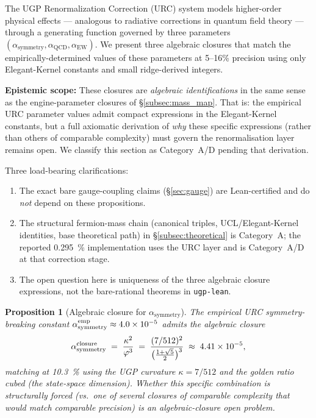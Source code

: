 \documentclass[11pt]{article}
\newtheorem{proposition}[theorem]{Proposition}
\theoremstyle{remark}
\begin{document}
The UGP Renormalization Correction (URC) system models higher-order physical effects --- analogous to radiative corrections in quantum field theory --- through a generating function governed by three parameters $(\alpha_{\mathrm{symmetry}}, \alpha_{\mathrm{QCD}}, \alpha_{\mathrm{EW}})$.
We present three algebraic closures that match the empirically-determined values of these parameters at 5--16\% precision using only Elegant-Kernel constants and small ridge-derived integers.

\noindent\textbf{Epistemic scope:}  These closures are \emph{algebraic identifications} in the same sense as the engine-parameter closures of \S\ref{subsec:mass_map}.
That is: the empirical URC parameter values admit compact expressions in the Elegant-Kernel constants, but a full axiomatic derivation of \emph{why} these specific expressions (rather than others of comparable complexity) must govern the renormalisation layer remains open.
We classify this section as Category~A/D pending that derivation.

\smallskip
Three load-bearing clarifications:
\begin{enumerate}[leftmargin=1.6em,itemsep=0.1em,topsep=0.2em,label=(\alph*)]
  \item The exact bare gauge-coupling claims (\S\ref{sec:gauge}) are Lean-certified and do \emph{not} depend on these propositions.
  \item The structural fermion-mass chain (canonical triples, UCL/Elegant-Kernel identities, base theoretical path) in \S\ref{subsec:theoretical} is Category~A; the reported \SI{0.295}{\percent} implementation uses the URC layer and is Category~A/D at that correction stage.
  \item The open question here is uniqueness of the three algebraic closure expressions, not the bare-rational theorems in \texttt{ugp-lean}.
\end{enumerate}

\begin{proposition}[Algebraic closure for $\alpha_{\mathrm{symmetry}}$]
\label{thm:alpha_sym}
The empirical URC symmetry-breaking constant $\alpha_{\mathrm{symmetry}}^{\rm emp} \approx 4.0 \times 10^{-5}$ admits the algebraic closure
\begin{equation}
\alpha_{\mathrm{symmetry}}^{\rm closure} \;=\; \frac{\kappa^2}{\varphi^3} \;=\; \frac{(7/512)^2}{\bigl(\tfrac{1+\sqrt{5}}{2}\bigr)^3} \;\approx\; 4.41 \times 10^{-5},
\end{equation}
matching at \SI{10.3}{\percent} using the UGP curvature $\kappa = 7/512$ and the golden ratio cubed (the state-space dimension).  Whether this specific combination is structurally forced (vs.\ one of several closures of comparable complexity that would match comparable precision) is an algebraic-closure open problem.
\end{proposition}
\end{document}
